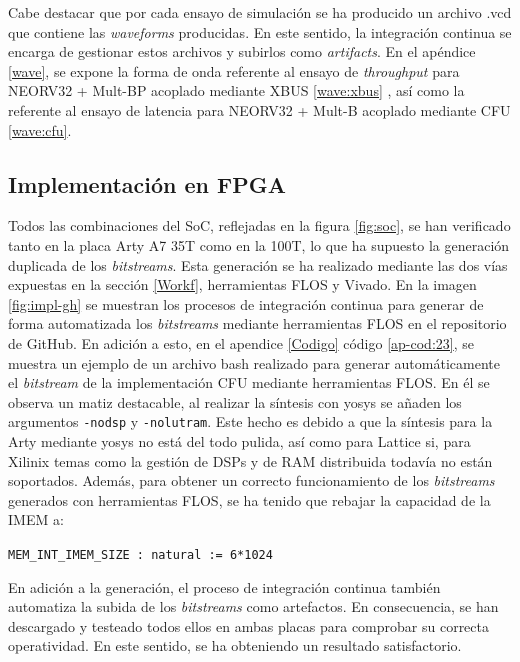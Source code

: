 \vspace{3cm}

Cabe destacar que por cada ensayo de simulación se ha producido un archivo .vcd que contiene las \textit{waveforms} producidas.
En este sentido, la integración continua se encarga de gestionar estos archivos y subirlos como \textit{artifacts}.
En el apéndice \ref{wave}, se expone la forma de onda referente al ensayo de \textit{throughput} para NEORV32 + Mult-BP acoplado mediante XBUS \ref{wave:xbus} , así como la referente al ensayo de latencia para NEORV32 + Mult-B acoplado mediante CFU  \ref{wave:cfu}.

\subsection{Implementación en FPGA}


Todos las combinaciones del SoC, reflejadas en la figura \ref{fig:soc}, se han verificado tanto en la placa Arty A7 35T como en la 100T, lo que ha supuesto la generación duplicada de los \textit{bitstreams}.
Esta generación se ha realizado mediante las dos vías expuestas en la sección \ref{Workf}, herramientas FLOS y Vivado.
En la imagen \ref{fig:impl-gh} se muestran los procesos de integración continua para generar de forma automatizada los \textit{bitstreams} mediante herramientas FLOS en el repositorio de GitHub. 
En adición a esto, en el apendice \ref{Codigo} código \ref{ap-cod:23}, se muestra un ejemplo de un archivo bash realizado para generar automáticamente el \textit{bitstream} de la implementación CFU mediante herramientas FLOS.
En él se observa un matiz destacable, al realizar la síntesis con yosys se añaden los argumentos  \texttt{-nodsp} y \texttt{-nolutram}.
Este hecho es debido a que la síntesis para la Arty mediante yosys no está del todo pulida, así como para Lattice si, para Xilinix temas como la gestión de DSPs y de RAM distribuida todavía no están soportados.
Además, para obtener un correcto funcionamiento de los \textit{bitstreams} generados con herramientas FLOS, se ha tenido que rebajar la capacidad de la IMEM a:

\hspace{30mm} \texttt{MEM_INT_IMEM_SIZE : natural := 6*1024}

\noindent En adición a la generación, el proceso de integración continua también automatiza la subida de los \textit{bitstreams} como artefactos.
En consecuencia, se han descargado y testeado todos ellos en ambas placas para comprobar su correcta operatividad.
En este sentido, se ha obteniendo un resultado satisfactorio.

